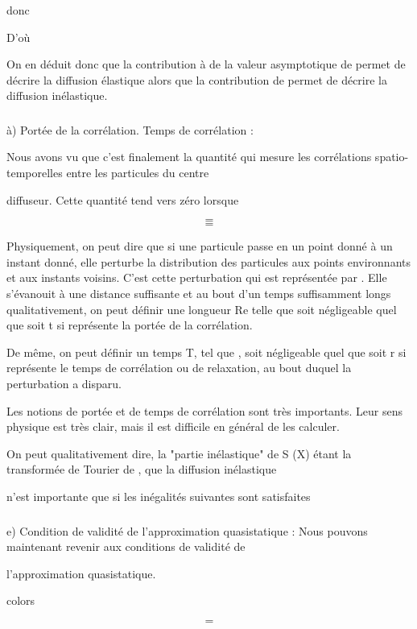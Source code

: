 {{{donc

D'où

On en déduit donc que la contribution à  de la valeur asymptotique de
 permet de décrire la diffusion élastique alors que la contribution de
 permet de décrire la diffusion inélastique.
\subsubsection{}%
à) Portée de la corrélation. Temps de corrélation :

Nous avons vu que c'est finalement la quantité  qui
mesure les corrélations spatio-temporelles entre les particules du centre

diffuseur. Cette quantité tend vers zéro lorsque

\[
\tag{146}=
\]
\[
\tag{147}=
\]

Physiquement, on peut dire que si une particule passe en un
point donné à un instant donné, elle perturbe la distribution des particules
aux points environnants et aux instants voisins. C'est cette perturbation qui
est représentée par . Elle s'évanouit à une distance suffisante et
au bout d'un temps suffisamment longs qualitativement, on peut définir une
longueur Re telle que  soit négligeable quel que soit t si
 représente la portée de la corrélation.

De même, on peut définir un temps T, tel que ,  soit
négligeable quel que soit r si  représente le temps de corrélation ou de relaxation,
au bout duquel la perturbation a disparu.

Les notions de portée et de temps de corrélation sont très importants. Leur sens
physique est très clair, mais il est difficile en général
de les calculer.

On peut qualitativement dire, la "partie inélastique" de S (X)
étant la transformée de Tourier de , que la diffusion inélastique

n'est importante que si les inégalités suivantes sont satisfaites

\subsubsection{}%
e) Condition de validité de l'approximation quasistatique :
Nous pouvons maintenant revenir aux conditions de validité de

l'approximation quasistatique.

colors


\[
\tag{148}=
\]

}}}
